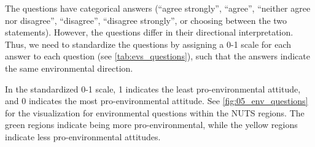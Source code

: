 \documentclass[12pt, a4paper]{article}
\begin{document}
\begin{table}[htbp]
\centering
\caption{Environmental Questions Dimension Mapping}
\label{tab:evs_env_questions}

\end{table}

\vspace{0.2cm}

The questions have categorical answers (``agree strongly'',
``agree'', ``neither agree nor disagree'', ``disagree'', ``disagree strongly'',
or choosing between the two statements). However, the questions differ
in their directional interpretation. Thus, we need to standardize
the questions by assigning a 0-1 scale for each answer to each question (see \autoref{tab:evs_questions}),
such that the answers indicate the same environmental direction.

In the standardized 0-1 scale, 1 indicates the least pro-environmental
attitude, and 0 indicates the most pro-environmental attitude. See 
\autoref{fig:05_env_questions} for the visualization for environmental questions within the NUTS
regions. The green regions indicate being more pro-environmental,
while the yellow regions indicate less pro-environmental attitudes.
\end{document}
